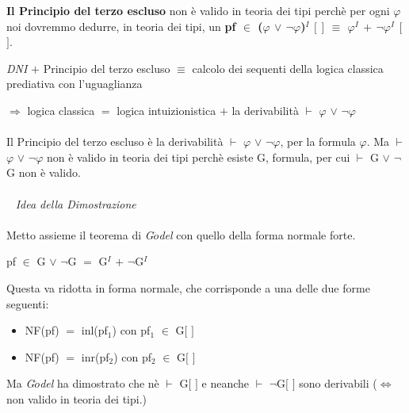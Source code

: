 \noindent
\textbf{Il Principio del terzo escluso} non \`e valido in teoria dei tipi perch\`e per ogni $\varphi$ noi dovremmo dedurre, in teoria dei tipi, un \textbf{pf $\in$ ($\varphi$ $\vee$ $\neg\varphi$)$^I$ $[$ $]$ $\equiv$ $\varphi^I$ $+$ $\neg\varphi^I$ $[$ $]$}. 
\begin{center}
\textit{DNI} $+$ Principio del terzo escluso $\equiv$ calcolo dei sequenti della logica classica prediativa con l'uguaglianza
\end{center}
\noindent
$\Rightarrow$ logica classica $=$ logica intuizionistica $+$ la derivabilit\`a $\vdash$ $\varphi$ $\vee$ $\neg\varphi$\\\\
\noindent
Il Principio del terzo escluso \`e la derivabilit\`a $\vdash$ $\varphi$ $\vee$ $\neg\varphi$, per la formula $\varphi$. Ma $\vdash$ $\varphi$ $\vee$ $\neg\varphi$ non \`e valido in teoria dei tipi perch\`e esiste G, formula, per cui $\vdash$ G $\vee$ $\neg$G non \`e valido.\\\\\
\noindent
\textit{Idea della Dimostrazione}\\\\
\noindent Metto assieme il teorema di \textit{G$\ddot{o}$del} con quello della forma normale forte.
\begin{center}pf $\in$ G $\vee$ $\neg$G $=$ G$^I$ $+$ $\neg$G$^I$\end{center}
Questa va ridotta in forma normale, che corrisponde a una delle due forme seguenti:
\begin{itemize}
\item NF(pf) $=$ inl(pf$_1$) con pf$_1$ $\in$ G$[$ $]$
\item NF(pf) $=$ inr(pf$_2$) con pf$_2$ $\in$ G$[$ $]$
\end{itemize}
Ma \textit{G$\ddot{o}$del} ha dimostrato che n\`e $\vdash$ G$[$ $]$ e neanche $\vdash$ $\neg$G$[$ $]$ sono derivabili ($\Leftrightarrow$ non valido in teoria dei tipi.)

